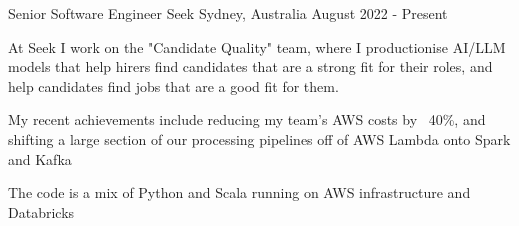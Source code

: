 


\begin{cventries}


\cventry
{Senior Software Engineer} %
{Seek} %
{Sydney, Australia} %
{August 2022 - Present} %
{ %
\begin{cvitems}
  \item {At Seek I work on the "Candidate Quality" team, where I productionise AI/LLM models that help hirers find candidates that are a strong fit for their roles, and help candidates find jobs that are a good fit for them.}
  \item {My recent achievements include reducing my team's AWS costs by ~40\%, and shifting a large section of our processing pipelines off of AWS Lambda onto Spark and Kafka}
  \item {The code is a mix of Python and Scala running on AWS infrastructure and Databricks}
\end{cvitems}
\vspace{2.0mm}
}



\end{cventries}
